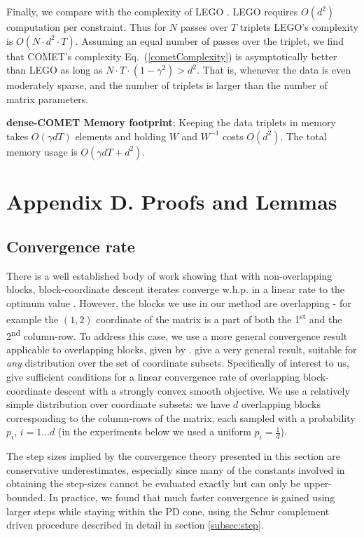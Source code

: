 \documentclass[twoside,11pt]{article}
\newcommand\mat[1]{{#1}}
\newcommand{\W}{\mat{W}}
\renewcommand{\eqref}[1]{Eq.~(\ref{#1})}
\begin{document}
Finally, we compare with the complexity of LEGO \citep{lego}. LEGO requires $O(d^2)$ computation per constraint. Thus for $N$ passes over $T$ triplets LEGO's complexity is $O(N\cdot d^2 \cdot T)$. Assuming an equal number of passes over the triplet, we find that COMET's complexity \eqref{cometComplexity} is asymptotically better than LEGO as long as $N \cdot T \cdot (1-\gamma^2) > d^2$. That is, whenever the data is even moderately sparse, and the number of triplets is larger than the number of matrix parameters.

{\bf dense-COMET Memory footprint}: Keeping the data triplets in memory takes $O(\gamma d T)$ elements and holding $\W$ and $\W^{-1}$ costs $O(d^2)$. The total memory usage is $O(\gamma d T + d^2)$. 



\section*{Appendix D. Proofs and Lemmas}


\subsection{Convergence rate}
There is a well established body of work showing that with non-overlapping blocks, block-coordinate descent iterates converge w.h.p. in a linear rate to the optimum value \citep{nesterov2012efficiency,richtarik2014iteration}.
However, the blocks we use in our method are overlapping - for example the $(1,2)$ coordinate of the matrix is a part of both the 1\textsuperscript{st} and the 2\textsuperscript{nd} column-row. To address this case, we use a more general convergence result applicable to overlapping blocks, given by \citet{richtarik2013optimal}. \citeauthor{richtarik2013optimal} give a very general result, suitable for \emph{any} distribution over the set of coordinate subsets. 
Specifically of interest to us, \citeauthor{richtarik2013optimal} give sufficient conditions for a linear convergence rate of overlapping block-coordinate descent with a strongly convex smooth objective. 
We use a relatively simple distribution over coordinate subsets: we have $d$ overlapping blocks corresponding to the column-rows of the matrix, each sampled with a probability $p_i$, $i=1 \ldots d$ (in the experiments below we used a uniform $p_i = \frac{1}{d}$).

The step sizes implied by the convergence theory presented in this section are conservative underestimates, especially since many of the constants involved in obtaining the step-sizes cannot be evaluated exactly but can only be upper-bounded. In practice, we found that much faster convergence is gained using larger steps while staying within the PD cone, using the Schur complement driven procedure described in detail in section \ref{subsec:step}.
\end{document}
